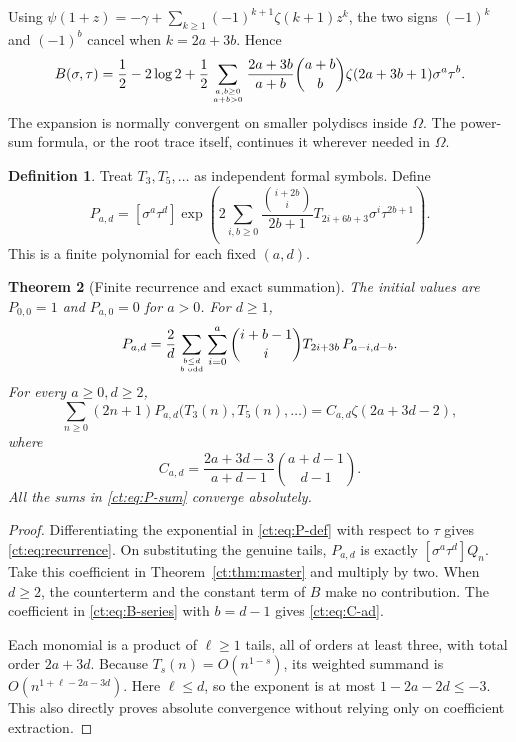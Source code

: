 \documentclass[11pt]{article}
\numberwithin{equation}{section}
\newtheorem{theorem}{Theorem}[section]
\theoremstyle{definition}\newtheorem{definition}[theorem]{Definition}
\theoremstyle{remark}\newtheorem{remark}[theorem]{Remark}
\newcommand{\Om}{\Omega}
\begin{document}
Using $\psi(1+z)=-\gamma+\sum_{k\ge1}(-1)^{k+1}\zeta(k+1)z^k$,
the two signs $(-1)^k$ and $(-1)^b$ cancel when $k=2a+3b$. Hence
\begin{equation}\label{ct:eq:B-series}
 B(\sigma,\tau)=\frac12-2\log2+
 \frac12\sum_{a,b\ge0\atop a+b>0}
 \frac{2a+3b}{a+b}\binom{a+b}{b}
       \zeta(2a+3b+1)\sigma^a\tau^b.
\end{equation}
The expansion is normally convergent on smaller polydiscs inside $\Om$.
The power-sum formula, or the root trace itself, continues it wherever
needed in $\Om$.

\begin{definition}\label{ct:def:P}
Treat $T_3,T_5,\ldots$ as independent formal symbols. Define
\begin{equation}\label{ct:eq:P-def}
 P_{a,d}=[\sigma^a\tau^d]\exp\left(
 2\sum_{i,b\ge0}\frac{\binom{i+2b}{i}}{2b+1}
       T_{2i+6b+3}\sigma^i\tau^{2b+1}\right).
\end{equation}
This is a finite polynomial for each fixed $(a,d)$.
\end{definition}

\begin{theorem}[Finite recurrence and exact summation]\label{ct:thm:coefficient}
The initial values are $P_{0,0}=1$ and $P_{a,0}=0$ for $a>0$. For $d\ge1$,
\begin{equation}\label{ct:eq:recurrence}
 P_{a,d}=\frac2d\sum_{b\le d\atop b\text{ odd}}
            \sum_{i=0}^a\binom{i+b-1}{i}
                T_{2i+3b}\,P_{a-i,d-b}.
\end{equation}
For every $a\ge0,d\ge2$,
\begin{equation}\label{ct:eq:P-sum}
 \sum_{n\ge0}(2n+1)P_{a,d}\bigl(T_3(n),T_5(n),\ldots\bigr)
       =C_{a,d}\zeta(2a+3d-2),
\end{equation}
where
\begin{equation}\label{ct:eq:C-ad}
 C_{a,d}=\frac{2a+3d-3}{a+d-1}\binom{a+d-1}{d-1}.
\end{equation}
All the sums in \eqref{ct:eq:P-sum} converge absolutely.
\end{theorem}
\begin{proof}
Differentiating the exponential in \eqref{ct:eq:P-def} with respect to
$\tau$ gives \eqref{ct:eq:recurrence}. On substituting the genuine tails,
$P_{a,d}$ is exactly $[\sigma^a\tau^d]Q_n$. Take this coefficient in
Theorem~\ref{ct:thm:master} and multiply by two. When $d\ge2$, the
counterterm and the constant term of $B$ make no contribution.
The coefficient in \eqref{ct:eq:B-series} with $b=d-1$ gives
\eqref{ct:eq:C-ad}.

Each monomial is a product of $\ell\ge1$ tails, all of orders at least
three, with total order $2a+3d$. Because $T_s(n)=O(n^{1-s})$, its weighted
summand is $O(n^{1+\ell-2a-3d})$. Here $\ell\le d$, so the exponent is
at most $1-2a-2d\le-3$. This also directly proves absolute convergence
without relying only on coefficient extraction.
\end{proof}
\end{document}
